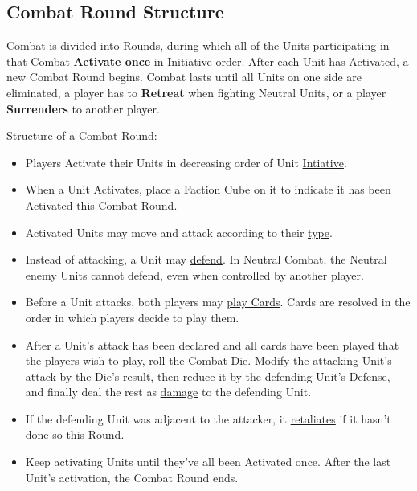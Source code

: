 \begin{multicols}{2}

\subsection*{Combat Round Structure}
Combat is divided into Rounds, during which all of the Units participating in that Combat \textbf{Activate once} in Initiative order.
After each Unit has Activated, a new Combat Round begins.
Combat lasts until all Units on one side are eliminated, a player has to \textbf{Retreat} when fighting Neutral Units, or a player \textbf{Surrenders} to another player.

Structure of a Combat Round:
\begin{itemize}
  \item Players Activate their Units in decreasing order of Unit \hyperlink{Initiative}{Intiative}.
  \item When a Unit Activates, place a Faction Cube on it to indicate it has been Activated this Combat Round.
  \item Activated Units may move and attack according to their \hyperlink{Unittype}{type}.
  \item Instead of attacking, a Unit may \hyperlink{Defend}{defend}.
  In Neutral Combat, the Neutral enemy Units cannot defend, even when controlled by another player.
  \item Before a Unit attacks, both players may \hyperlink{CombatCards}{play Cards}. Cards are resolved in the order in which players decide to play them.
  \item After a Unit's attack has been declared and all cards have been played that the players wish to play, roll the Combat Die.
    Modify the attacking Unit's attack by the Die's result, then reduce it by the defending Unit's Defense, and finally deal the rest as \hyperlink{HP}{damage} to the defending Unit.
  \item If the defending Unit was adjacent to the attacker, it \hyperlink{Retaliate}{retaliates} if it hasn't done so this Round.
  \item Keep activating Units until they've all been Activated once.
After the last Unit's activation, the Combat Round ends.
\end{itemize}

\end{multicols}
